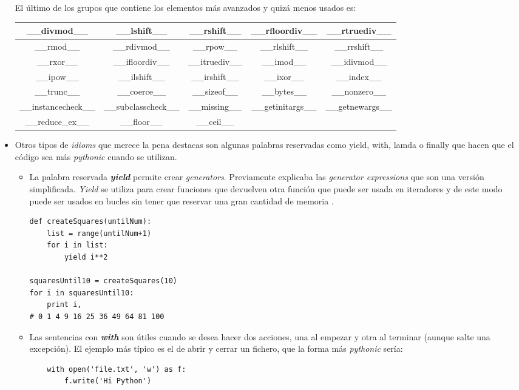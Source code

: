 \documentclass[a4paper, 12pt]{book}
\begin{document}
\begin{itemize}
El último de los grupos que contiene los elementos más avanzados y quizá menos usados es:

\begin{center}
\begin{tabular}{ | c | c | c | c | c |}
\hline
\_\_divmod\_\_ & \_\_lshift\_\_ & \_\_rshift\_\_ & \_\_rfloordiv\_\_ & \_\_rtruediv\_\_ \\
\hline
\_\_rmod\_\_ & \_\_rdivmod\_\_ & \_\_rpow\_\_ & \_\_rlshift\_\_ & \_\_rrshift\_\_ \\
\hline
\_\_rxor\_\_ & \_\_ifloordiv\_\_ & \_\_itruediv\_\_ & \_\_imod\_\_ & \_\_idivmod\_\_ \\
\hline
\_\_ipow\_\_ & \_\_ilshift\_\_ & \_\_irshift\_\_ & \_\_ixor\_\_ & \_\_index\_\_ \\
\hline
\_\_trunc\_\_ & \_\_coerce\_\_ & \_\_sizeof\_\_ & \_\_bytes\_\_ & \_\_nonzero\_\_ \\
\hline
\_\_instancecheck\_\_ & \_\_subclasscheck\_\_ & \_\_missing\_\_ & \_\_getinitargs\_\_ & \_\_getnewargs\_\_ \\
\hline
\_\_reduce\_ex\_\_ &  \_\_floor\_\_ & \_\_ceil\_\_ &  & \\
\hline
\end{tabular}
\end{center}


\item Otros tipos de \textit{idioms} que merece la pena destacas son algunas palabras reservadas como yield, with, lamda o finally que hacen que el código sea más \textit{pythonic} cuando se utilizan.

\begin{itemize}
\item La palabra reservada \textbf{\textit{yield}} permite crear \textit{generators}. Previamente explicaba las \textit{generator expressions} que son una versión simplificada. \textit{Yield} se utiliza para crear funciones que devuelven otra función que puede ser usada en iteradores y de este modo puede ser usados en bucles sin tener que reservar una gran cantidad de memoria \cite{lubanovic2014introducing}.

\begin{verbatim}
def createSquares(untilNum):
    list = range(untilNum+1)
    for i in list:
        yield i**2

squaresUntil10 = createSquares(10)
for i in squaresUntil10:
    print i,
# 0 1 4 9 16 25 36 49 64 81 100
\end{verbatim}

\item Las sentencias con \textbf{\textit{with}} \cite{with_statement} son útiles cuando se desea hacer dos acciones, una al empezar y otra al terminar (aunque salte una excepción). El ejemplo más típico es el de abrir y cerrar un fichero, que la forma más \textit{pythonic} sería:
\begin{verbatim}
    with open('file.txt', 'w') as f:
        f.write('Hi Python')
\end{verbatim}


\end{itemize}
\end{itemize}
\end{document}
